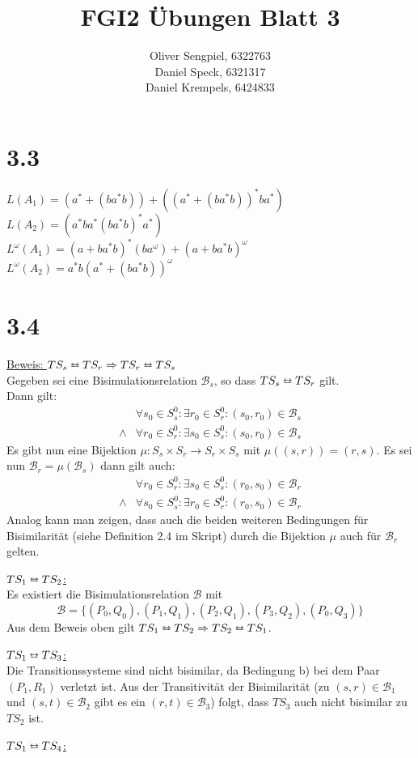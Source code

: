 \documentclass{article}
\title{FGI2 Übungen Blatt 3}
\author{Oliver Sengpiel, 6322763 \\ Daniel Speck, 6321317 \\ Daniel
Krempels, 6424833}
\begin{document}
\maketitle

\section*{3.3}
$L(A_1) = (a^* + (ba^*b)) + ((a^* + (ba^*b))^* ba^*)$ \\
$L(A_2) = (a^*ba^*(ba^*b)^*a^*)$ \\
$L^\omega(A_1) = (a + ba^*b)^*(ba^\omega) + (a + ba^*b)^\omega$ \\
$L^\omega(A_2) = a^*b(a^* + (ba^*b))^\omega$ \\

\section*{3.4}
\underline{Beweis: $TS_s \leftrightarroweq TS_r \Rightarrow TS_r
\leftrightarroweq TS_s$}\\
Gegeben sei eine Bisimulationsrelation $\mathcal{B}_s$, so dass $TS_s
\leftrightarroweq TS_r$ gilt.\\
Dann gilt:
\begin{align*}
&\forall s_0 \in S_s^0 : \exists r_0 \in S_r^0 : (s_0,r_0) \in \mathcal{B}_s \\
\wedge & \forall r_0 \in S_r^0 : \exists s_0 \in S_s^0 : (s_0,r_0) \in \mathcal{B}_s
\end{align*}
Es gibt nun eine Bijektion $\mu : S_s \times S_r \to S_r \times S_{s}$ mit
$\mu((s,r)) = (r,s)$.
Es sei nun $\mathcal{B}_r = \mu(\mathcal{B}_s)$ dann gilt auch:
\begin{align*}
&\forall r_0 \in S_r^0 : \exists s_0 \in S_s^0 : (r_0,s_0) \in \mathcal{B}_r \\
\wedge & \forall s_0 \in S_s^0 : \exists r_0 \in S_r^0 : (r_0,s_0) \in
\mathcal{B}_r
\end{align*}
Analog kann man zeigen, dass auch die beiden weiteren Bedingungen für
Bisimilarität (siehe Definition 2.4 im Skript) durch die Bijektion $\mu$ auch
für $\mathcal{B}_r$ gelten.

\underline{$TS_1 \leftrightarroweq TS_2$:}\\
Es existiert die Bisimulationsrelation $\mathcal{B}$ mit
\[
    \mathcal{B} = \{ (P_0,Q_0), (P_1,Q_1), (P_2,Q_1), (P_3,Q_2), (P_0,Q_3)\}
\]
Aus dem Beweis oben gilt $TS_1 \leftrightarroweq TS_2 \Rightarrow TS_2
\leftrightarroweq TS_1$.

\underline{$TS_1 \leftrightarroweq TS_3$:}\\
Die Transitionssysteme sind nicht bisimilar, da Bedingung b) bei dem Paar
$(P_1,R_1)$ verletzt ist.
Aus der Transitivität der Bisimilarität (zu $(s,r) \in \mathcal{B}_1$ und $(s,t)
\in \mathcal{B}_2$ gibt es ein $(r,t) \in \mathcal{B}_3$) folgt, dass $TS_3$
auch nicht bisimilar zu $TS_2$ ist.

\underline{$TS_1 \leftrightarroweq TS_4$:}\\
\end{document}
